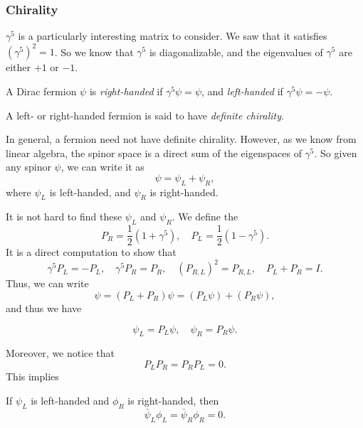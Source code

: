 \documentclass[a4paper]{article}
\begin{document}
\subsubsection*{Chirality}
$\gamma^5$ is a particularly interesting matrix to consider. We saw that it satisfies $(\gamma^5)^2 = 1$. So we know that $\gamma^5$ is diagonalizable, and the eigenvalues of $\gamma^5$ are either $+1$ or $-1$.
\begin{defi}[Chirality]
  A Dirac fermion $\psi$ is \emph{right-handed} if $\gamma^5 \psi = \psi$, and \emph{left-handed} if $\gamma^5 \psi =- \psi$.

  A left- or right-handed fermion is said to have \emph{definite chirality}.
\end{defi}
In general, a fermion need not have definite chirality. However, as we know from linear algebra, the spinor space is a direct sum of the eigenspaces of $\gamma^5$. So given any spinor $\psi$, we can write it as
\[
  \psi = \psi_L + \psi_R,
\]
where $\psi_L$ is left-handed, and $\psi_R$ is right-handed.

It is not hard to find these $\psi_L$ and $\psi_R$. We define the 
\[
  P_R = \frac{1}{2} (1 + \gamma^5),\quad P_L = \frac{1}{2} (1 - \gamma^5).
\]
It is a direct computation to show that
\[
  \gamma^5 P_L = - P_L,\quad \gamma^5 P_R = P_R,\quad (P_{R, L})^2 = P_{R, L},\quad P_L + P_R = I.
\]
Thus, we can write
\[
  \psi = (P_L + P_R) \psi = (P_L \psi) + (P_R \psi),
\]
and thus we have
\begin{notation}
  \[
    \psi_L = P_L \psi,\quad \psi_R = P_R \psi.
  \]
\end{notation}
Moreover, we notice that
\[
  P_L P_R = P_R P_L = 0.
\]
This implies
\begin{lemma}
  If $\psi_L$ is left-handed and $\phi_R$ is right-handed, then
  \[
    \bar\psi_L \phi_L = \bar\psi_R \phi_R = 0.
  \]
\end{lemma}
\end{document}
